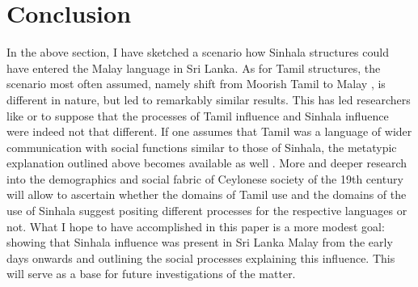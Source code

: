 \documentclass[a4paper,10pt]{article}
\begin{document}
\section{Conclusion}
In the above section, I have sketched a scenario how Sinhala structures could have entered the Malay language in Sri Lanka. As for Tamil structures, the scenario most often assumed, namely shift from Moorish Tamil to Malay \citep{SmithEtAl2004, SmithEtAl2006cll, Slomanson2006cll}, is different in nature, but led to remarkably similar results. This has led researchers like \citet{Bakker2006, Ansaldo2008genesis} or \citet{Nordhoff2009phd} to suppose that the processes of Tamil influence and Sinhala influence were indeed not that different. If one assumes that Tamil was a language of wider communication with social functions similar to those of Sinhala, the metatypic explanation outlined above becomes available as well \citep{Bakker2006,Ansaldo2008genesis}. More and deeper research into the demographics and social fabric of Ceylonese society of the 19th century will allow to ascertain whether the domains of Tamil use and the domains of the use of Sinhala suggest positing different processes for the respective languages or not. What I hope to have accomplished in this paper is a more modest goal: showing that Sinhala influence was present in Sri Lanka Malay from the early days onwards and outlining the social processes explaining this influence.  This will serve as a base for future investigations of the matter.
  






\nocite{Verma1976,Gair1998}
\end{document}
